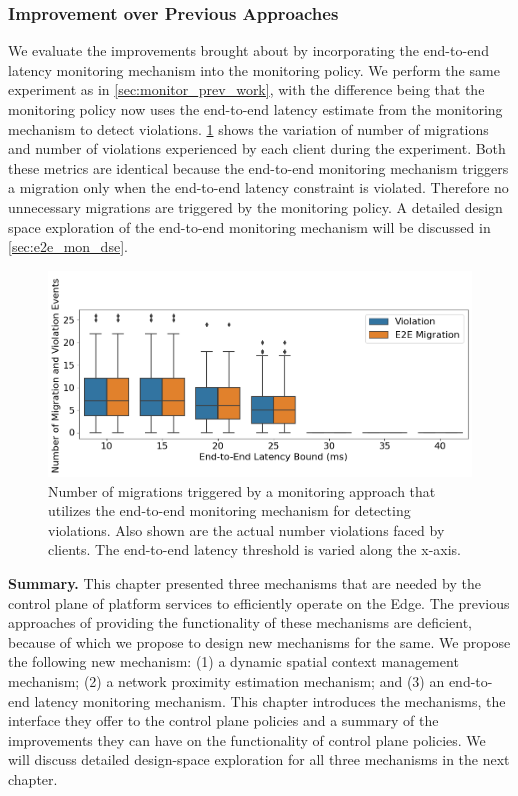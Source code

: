 \subsubsection{Improvement over Previous Approaches}
We evaluate the improvements brought about by incorporating the end-to-end latency monitoring mechanism into the monitoring policy. We perform the same experiment as in \cref{sec:monitor_prev_work}, with the difference being that the monitoring policy now uses the end-to-end latency estimate from the monitoring mechanism to detect violations. \cref{fig:migration_count_e2e} shows the variation of number of migrations and number of violations experienced by each client during the experiment. Both these metrics are identical because the end-to-end monitoring mechanism triggers a migration only when the end-to-end latency constraint is violated. Therefore no unnecessary migrations are triggered by the monitoring policy. A detailed design space exploration of the end-to-end monitoring mechanism will be discussed in \cref{sec:e2e_mon_dse}.
\begin{figure}
\centering
\includegraphics[width=0.75\linewidth]{figures/mechanisms/monitoring/migrations_count_e2e.png}
\caption{Number of migrations triggered by a monitoring approach that utilizes the end-to-end monitoring mechanism for detecting violations. Also shown are the actual number violations faced by clients. The end-to-end latency threshold is varied along the x-axis.}
\label{fig:migration_count_e2e}
\end{figure}

\par \noindent \textbf{Summary.} This chapter presented three mechanisms that are needed by the control plane of platform services to efficiently operate on the Edge. The previous approaches of providing the functionality of these mechanisms are deficient, because of which we propose to design new mechanisms for the same. We propose the following new mechanism: (1) a dynamic spatial context management mechanism; (2) a network proximity estimation mechanism; and (3) an end-to-end latency monitoring mechanism. This chapter introduces the mechanisms, the interface they offer to the control plane policies and a summary of the improvements they can have on the functionality of control plane policies. We will discuss detailed design-space exploration for all three mechanisms in the next chapter.